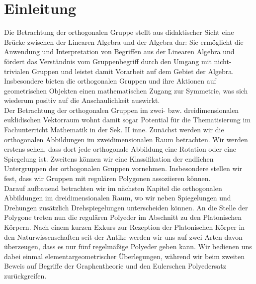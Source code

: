 \section{Einleitung}
Die Betrachtung der orthogonalen Gruppe stellt aus didaktischer Sicht eine Brücke zwischen der Linearen Algebra und der Algebra dar: Sie ermöglicht die Anwendung und Interpretation von Begriffen aus der Linearen Algebra und fördert das Verständnis vom Gruppenbegriff durch den Umgang mit nicht-trivialen Gruppen und leistet damit Vorarbeit auf dem Gebiet der Algebra. Insbesondere bieten die orthogonalen Gruppen und ihre Aktionen auf geometrischen Objekten einen mathematischen Zugang zur Symmetrie, was sich wiederum positiv auf die Anschaulichkeit auswirkt.\\
Der Betrachtung der orthogonalen Gruppen im zwei- bzw. dreidimensionalen euklidischen Vektorraum wohnt damit sogar Potential für die Thematisierung im Fachunterricht Mathematik in der Sek. II inne. 
Zunächst werden wir die orthogonalen Abbildungen im zweidimensionalen Raum betrachten. Wir werden erstens sehen, dass dort jede orthogonale Abbildung eine Rotation oder eine Spiegelung ist. Zweitens können wir eine Klassifikation der endlichen Untergruppen der orthogonalen Gruppen vornehmen. Insbesondere stellen wir fest, dass wir Gruppen mit regulären Polygonen assoziieren können.\\
Darauf aufbauend betrachten wir im nächsten Kapitel die orthogonalen Abbildungen im dreidimensionalen Raum, wo wir neben Spiegelungen und Drehungen zusätzlich Drehspiegelungen unterscheiden können. An die Stelle der Polygone treten nun die regulären Polyeder im Abschnitt zu den Platonischen Körpern. Nach einem kurzen Exkurs zur Rezeption der Platonischen Körper in den Naturwissenschaften seit der Antike werden wir uns auf zwei Arten davon überzeugen, dass es nur fünf regelmäßige Polyeder geben kann. Wir bedienen uns dabei einmal elementargeometrischer Überlegungen, während wir beim zweiten Beweis auf Begriffe der Graphentheorie und den Eulerschen Polyedersatz zurückgreifen.\\
